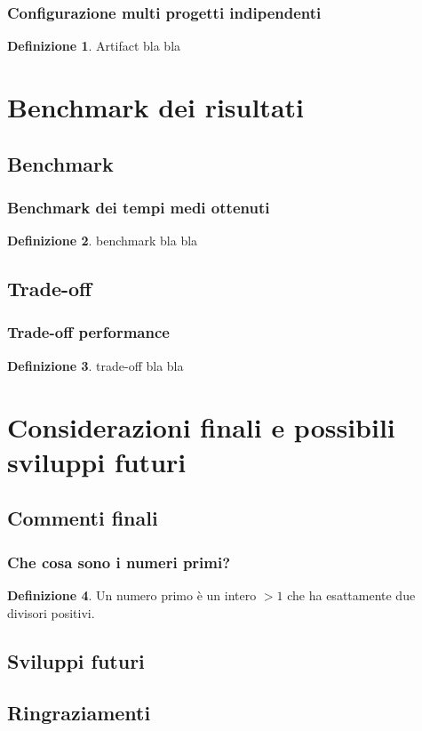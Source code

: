 \documentclass{beamer}
\theoremstyle{definition}
\newtheorem{definizione}{Definizione}
\theoremstyle{plain}
\begin{document}
\begin{frame}
\frametitle{Configurazione multi progetti indipendenti}
\begin{definizione}
\alert{Artifact} bla bla
\end{definizione}
\end{frame}

\section{Benchmark dei risultati}

\subsection{Benchmark}
\begin{frame}
\frametitle{Benchmark dei tempi medi ottenuti}
\begin{definizione}
 \alert{benchmark} bla bla
\end{definizione}
\end{frame}

\subsection{Trade-off}
\begin{frame}
\frametitle{Trade-off performance}
\begin{definizione}
\alert{trade-off} bla bla
\end{definizione}
\end{frame}

\section{Considerazioni finali e possibili sviluppi futuri}
\subsection{Commenti finali}
\begin{frame}
\frametitle{Che cosa sono i numeri primi?}
\begin{definizione}
Un \alert{numero primo} è un intero $>1$ che ha esattamente
due divisori positivi.
\end{definizione}
\end{frame}
\subsection{Sviluppi futuri}
\subsection{Ringraziamenti}
\end{document}
